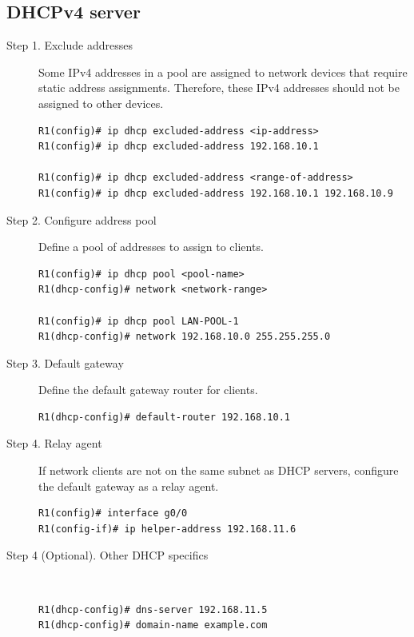 \subsection{DHCPv4 server}

\begin{description}
\item[Step 1. Exclude addresses]Some IPv4 addresses in a pool are assigned to network devices that require static address assignments. Therefore, these IPv4 addresses should not be assigned to other devices.

\begin{verbatim}
R1(config)# ip dhcp excluded-address <ip-address>
R1(config)# ip dhcp excluded-address 192.168.10.1

R1(config)# ip dhcp excluded-address <range-of-address>
R1(config)# ip dhcp excluded-address 192.168.10.1 192.168.10.9
\end{verbatim}

\item[Step 2. Configure address pool]Define a pool of addresses to assign to clients.

\begin{verbatim}
R1(config)# ip dhcp pool <pool-name>
R1(dhcp-config)# network <network-range>

R1(config)# ip dhcp pool LAN-POOL-1
R1(dhcp-config)# network 192.168.10.0 255.255.255.0
\end{verbatim}

\item[Step 3. Default gateway]Define the default gateway router for clients. 

\begin{verbatim}
R1(dhcp-config)# default-router 192.168.10.1
\end{verbatim}

\item[Step 4. Relay agent]If network clients are not on the same subnet as DHCP servers, configure the default gateway as a relay agent.

\begin{verbatim}
R1(config)# interface g0/0
R1(config-if)# ip helper-address 192.168.11.6
\end{verbatim}

\item[Step 4 (Optional). Other DHCP specifics]\\

\begin{verbatim}
R1(dhcp-config)# dns-server 192.168.11.5
R1(dhcp-config)# domain-name example.com
\end{verbatim}


\end{description}
